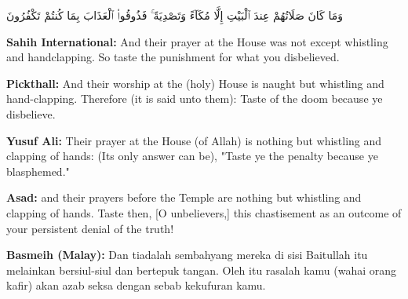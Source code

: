 \documentclass[11pt,a4paper,openany]{book}
\let\textAR\textarabic
\newcommand{\quranverse}[1]{{\centering\Large\textAR{#1}\par}}
\begin{document}
\begin{quranbox}[Qur'an 8:35]
\quranverse{وَمَا كَانَ صَلَاتُهُمْ عِندَ ٱلْبَيْتِ إِلَّا مُكَآءً وَتَصْدِيَةً ۚ فَذُوقُوا۟ ٱلْعَذَابَ بِمَا كُنتُمْ تَكْفُرُونَ}

\vspace{6pt}
\noindent\textbf{Sahih International:} And their prayer at the House was not except whistling and handclapping. So taste the punishment for what you disbelieved.

\vspace{4pt}
\noindent\textbf{Pickthall:} And their worship at the (holy) House is naught but whistling and hand-clapping. Therefore (it is said unto them): Taste of the doom because ye disbelieve.

\vspace{4pt}
\noindent\textbf{Yusuf Ali:} Their prayer at the House (of Allah) is nothing but whistling and clapping of hands: (Its only answer can be), "Taste ye the penalty because ye blasphemed."

\vspace{4pt}
\noindent\textbf{Asad:} and their prayers before the Temple are nothing but whistling and clapping of hands. Taste then, [O unbelievers,] this chastisement as an outcome of your persistent denial of the truth!

\vspace{4pt}
\noindent\textbf{Basmeih (Malay):} Dan tiadalah sembahyang mereka di sisi Baitullah itu melainkan bersiul-siul dan bertepuk tangan. Oleh itu rasalah kamu (wahai orang kafir) akan azab seksa dengan sebab kekufuran kamu.
\end{quranbox}
\end{document}
